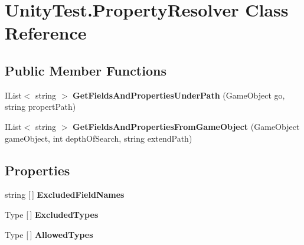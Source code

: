 \hypertarget{class_unity_test_1_1_property_resolver}{}\section{Unity\+Test.\+Property\+Resolver Class Reference}
\label{class_unity_test_1_1_property_resolver}
\subsection*{Public Member Functions}
\begin{DoxyCompactItemize}
\item 
\mbox{\label{class_unity_test_1_1_property_resolver_aeb64a4959c0fa772d9a5223a9d442516}} 
I\+List$<$ string $>$ {\bfseries Get\+Fields\+And\+Properties\+Under\+Path} (Game\+Object go, string propert\+Path)
\item 
\mbox{\label{class_unity_test_1_1_property_resolver_a9b83943f295949871095ac1d906d78c3}} 
I\+List$<$ string $>$ {\bfseries Get\+Fields\+And\+Properties\+From\+Game\+Object} (Game\+Object game\+Object, int depth\+Of\+Search, string extend\+Path)
\end{DoxyCompactItemize}
\subsection*{Properties}
\begin{DoxyCompactItemize}
\item 
\mbox{\label{class_unity_test_1_1_property_resolver_a2c35067584cc6981fd38143648b5a8ce}} 
string \mbox{[}$\,$\mbox{]} {\bfseries Excluded\+Field\+Names}
\item 
\mbox{\label{class_unity_test_1_1_property_resolver_a43dca2cea9b63de35135d798df13fea5}} 
Type \mbox{[}$\,$\mbox{]} {\bfseries Excluded\+Types}
\item 
\mbox{\label{class_unity_test_1_1_property_resolver_a548d42096704cd424b60bfec53ae37dc}} 
Type \mbox{[}$\,$\mbox{]} {\bfseries Allowed\+Types}
\end{DoxyCompactItemize}
